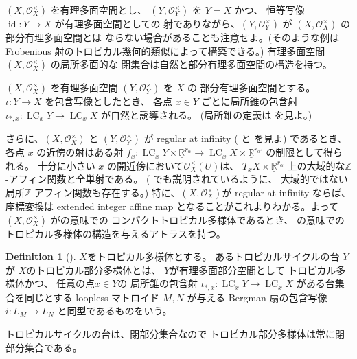 \documentclass[a4paper,dvipdfmx,reqno,12pt]{amsart}
\theoremstyle{definition}
\newtheorem{definition}[theorem]{Definition}
\newcommand{\opn}[1]{\operatorname{#1}}
\numberwithin{equation}{section}
\begin{document}
$(X,\mathcal{O}_X^{\times})$ を有理多面空間とし、
$(Y,\mathcal{O}_Y^{\times})$ を $Y=X$ かつ、
恒等写像 $\opn{id}\colon Y\to X$ が有理多面空間としての
射でありながら、$(Y,\mathcal{O}_Y^{\times})$ が
$(X,\mathcal{O}_X^{\times})$ の部分有理多面空間とは
ならない場合があることも注意せよ。(そのような例は
Frobenious 射のトロピカル幾何的類似によって構築できる。)
有理多面空間 $(X,\mathcal{O}_X^{\times})$ の局所多面的な
閉集合は自然と部分有理多面空間の構造を持つ。

$(X,\mathcal{O}_X^{\times})$ を有理多面空間
$(Y,\mathcal{O}_Y^{\times})$ を $X$ の
部分有理多面空間とする。
$\iota\colon Y \to X$ を包含写像としたとき、
各点 $x\in Y$ ごとに局所錐の包含射
$\iota_{*,x}\colon \opn{LC}_x Y\to \opn{LC}_x X$
が自然と誘導される。
(局所錐の定義は\cite[]{MR4637248}
を見よ。)

さらに、$(X,\mathcal{O}_X^{\times})$ と
$(Y,\mathcal{O}_Y^{\times})$ が
regular at infinity 
(\cite[]{MR4637248} と
\cite[Definition 1.2]{MR3330789} を見よ) 
であるとき、各点 $x$ の近傍の射はある射
$f_{x}\colon \opn{LC}_x Y\times 
\underline{\mathbb{R}}^{r_{\alpha}}
\to \opn{LC}_x X\times \underline{\mathbb{R}}^{r_{\alpha'}}$
の制限として得られる。
十分に小さい $x$
の開近傍において$\mathcal{O}_X^{\times}(U)$は、
$T_x X\times \underline{\mathbb{R}}^{r_{\alpha}}$
上の大域的な$\mathbb{Z}$-アフィン関数と全単射である。
(\cite[Example 2.1]{MR4637248} でも説明されているように、
大域的ではない局所$\mathbb{Z}$-アフィン関数も存在する。)
特に、$(X,\mathcal{O}_X^{\times})$が regular at infinity
ならば、座標変換は
extended integer affine map \cite[Definition 2.2]{demedrano2023chern}
となることがこれよりわかる。よって
$(X,\mathcal{O}_X^{\times})$ 
が\cite[Definition 6.1]{gross2019sheaftheoretic}の意味での
コンパクトトロピカル多様体であるとき、
\cite[Definition 2.3]{demedrano2023chern}
の意味でのトロピカル多様体の構造を与えるアトラスを持つ。



\begin{definition}[{\cite[Definition 2.14]{demedrano2023chern}}]
$X$をトロピカル多様体とする。
あるトロピカルサイクルの台 $Y$ が
$X$のトロピカル部分多様体とは、
$Y$が有理多面部分空間として
トロピカル多様体かつ、
任意の点$x\in Y$の
局所錐の包含射
$\iota_{*,x}\colon \opn{LC}_x Y\to 
\opn{LC}_x X$
がある台集合を同じとする loopless マトロイド
$M,N$ が与える Bergman 扇の包含写像
$i \colon L_M\to L_N$
と同型であるものをいう。
\end{definition}

トロピカルサイクルの台は、閉部分集合なので
トロピカル部分多様体は常に閉部分集合である。
\end{document}
